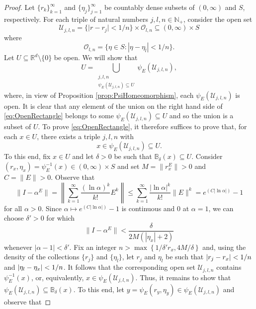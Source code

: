 \documentclass[11pt]{article}
\theoremstyle{remark}
\begin{document}
\begin{proof}
Let $\{r_k\}_{k=1}^\infty$ and $\{\eta_j\}_{j=1}^\infty$ be countably dense subsets of $(0,\infty)$ and $S$, respectively.  For each triple of natural numbers $j,l,n\in\mathbb{N}_+$, consider the open set
\begin{equation*}
\mathcal{U}_{j,l,n}=\{ \vert r - r_j \vert < 1/n \}\times \mathcal{O}_{l,n}\subseteq (0,\infty)\times S
\end{equation*}
where
\begin{equation*}
\mathcal{O}_{l,n}=\{\eta\in S: |\eta-\eta_l|<1/n\}.
\end{equation*}
Let $U\subseteq \mathbb{R}^d\setminus \{0\}$ be open. We will show that
\begin{equation}\label{eq:OpenRectangle}
U=\bigcup_{\substack{j,l,n\\ \psi_E(\mathcal{U}_{j,l,n})\subseteq U}}\psi_E(\mathcal{U}_{j,l,n}),
\end{equation}
where, in view of Proposition \ref{prop:PsiHomeomorphism}, each $\psi_E(\mathcal{U}_{j,l,n})$ is open. It is clear that any element of the union on the right hand side of \eqref{eq:OpenRectangle} belongs to some $\psi_E(\mathcal{U}_{j,l,n}) \subseteq U$ and so the union is a subset of $U$. To prove \eqref{eq:OpenRectangle}, it therefore suffices to prove that, for each $x\in U$, there exists a triple $j,l,n$ with
\begin{equation*}
x\in\psi_E(\mathcal{U}_{j,l,n})\subseteq U.
\end{equation*}
To this end, fix $x\in U$ and let $\delta>0$ be such that $\mathbb{B}_\delta(x)\subseteq U$. Consider $(r_x,\eta_x)=\psi_E^{-1}(x)\in (0,\infty)\times S$ and set $M=\|r_x^E\|>0$ and $C=\|E\|>0$. Observe that 
\begin{equation*}
\|I-\alpha^E\|=\left\|\sum_{k=1}^\infty \frac{(\ln \alpha)^k}{k!} E^k\right\|\leq \sum_{k=1}^\infty \frac{|\ln \alpha|^k}{k!} \|E\|^k=e^{(C|\ln \alpha|)}-1
\end{equation*}
for all $\alpha>0$. Since $\alpha\mapsto e^{(C|\ln \alpha|)}-1$ is continuous and $0$ at $\alpha=1$, we can choose $\delta'>0$ for which
\begin{equation*}
\|I-\alpha ^E\|< \frac{\delta}{2M (  |\eta_x|+2)}
\end{equation*}
whenever $|\alpha-1|<\delta'$. Fix an integer $n>\max \left\{1/\delta'r_x, 4M/\delta \right\}$ and, using the density of the collections $\{r_j\}$ and $\{\eta_l\}$, let $r_j$ and $ \eta_l$ be such that $\abs{r_j - r_x } < 1/n$ and $\abs{\eta_l - \eta_x} < 1/n$. It follows that the corresponding open set $\mathcal{U}_{j,l,n}$ contains $\psi_E^{-1}(x)$, or, equivalently, $x\in \psi_E(\mathcal{U}_{j,l,n})$. Thus, it remains to show that $\psi_E(\mathcal{U}_{j,l,n}) \subseteq \mathbb{B}_\delta(x)$. To this end, let $y=\psi_E(r_y,\eta_y)\in\psi_E(\mathcal{U}_{j,l,n})$ and observe that

\end{proof}
\end{document}
